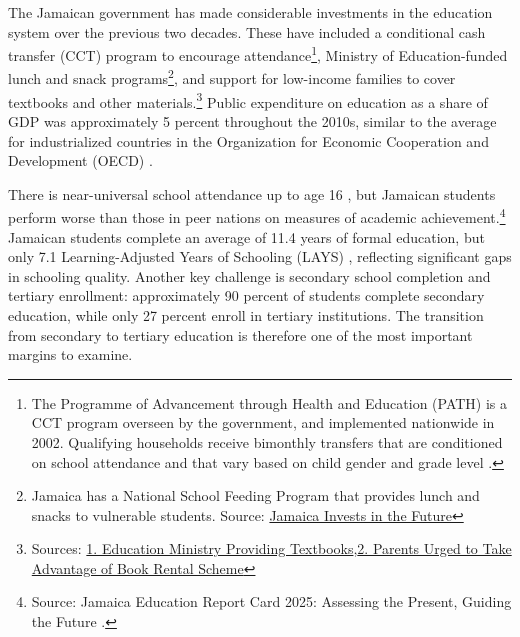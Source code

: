 \documentclass[12pt]{article}
\newcommand*{\GraphPath}{../Paper_3_Graphs}
\renewcommand\footnotesize{\fontsize{11}{13}\selectfont}
\begin{document}
The Jamaican government has made considerable investments in the education system over the previous two decades. These have included a conditional cash transfer (CCT) program to encourage attendance\footnote{\footnotesize The Programme of Advancement through Health and Education (PATH) is a CCT program overseen by the government, and implemented nationwide in 2002. Qualifying households receive bimonthly transfers that are conditioned on school attendance and that vary based on child gender and grade level \parencite{ stampini_conditional_2018, levy_evaluation_2010}.}, Ministry of Education-funded lunch and snack programs\footnote{\footnotesize Jamaica has a National School Feeding Program that provides lunch and snacks to  vulnerable students. Source: \href{https://www.advocacyincubator.org/news/2025-06-16-jamaica-invests-in-the-future-country-moves-forward-with-national-school-nutrition-policy}{Jamaica Invests in the Future}}, and support for low-income families to cover textbooks and other materials.\footnote{\footnotesize Sources: \href{https://jis.gov.jm/education-ministry-providing-textbooks-for-primary-and-secondary-schools/}{1. Education Ministry Providing Textbooks},\href{https://jis.gov.jm/parents-urged-take-advantage-book-rental-scheme/}{2. Parents Urged to Take Advantage of Book Rental Scheme}} Public expenditure on education as a share of GDP was approximately 5 percent throughout the 2010s, similar to the average for industrialized countries in the Organization for Economic Cooperation and Development (OECD) \parencite{ chegwin_school_2021-1}. 

	There is near-universal school attendance up to age 16 \parencite{world_bank_jamaica_2022}, but Jamaican students perform worse than those in peer nations on measures of academic achievement.\footnote{\footnotesize Source: Jamaica Education Report Card 2025: Assessing the Present, Guiding the Future \parencite{ caribbean_policy_research_institute_jamaica_2025}.} Jamaican students complete an average of 11.4 years of formal education, but only 7.1 Learning-Adjusted Years of Schooling (LAYS) \parencite{world_bank_jamaica_2022}, reflecting significant gaps in schooling quality. Another key challenge is secondary school completion and tertiary enrollment: approximately 90 percent of students complete secondary education, while only 27 percent enroll in tertiary institutions. The transition from secondary to tertiary education is therefore one of the most important margins to examine.

\end{document}
